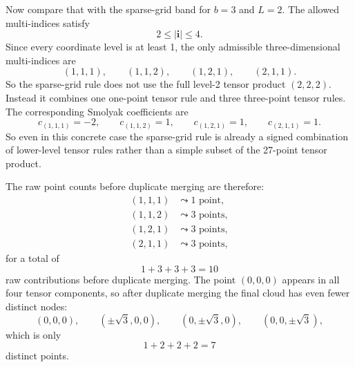 \documentclass[11pt]{article}
\numberwithin{equation}{section}
\begin{document}
Now compare that with the sparse-grid band for \(b=3\) and \(L=2\).  The
allowed multi-indices satisfy
\begin{equation}
  2\le |\mathbf i| \le 4.
  \label{eq:p37-3d-band}
\end{equation}
Since every coordinate level is at least 1, the only admissible three-dimensional
multi-indices are
\begin{equation}
  (1,1,1),
  \qquad
  (1,1,2),
  \qquad
  (1,2,1),
  \qquad
  (2,1,1).
  \label{eq:p37-3d-active-indices}
\end{equation}
So the sparse-grid rule does not use the full level-2 tensor product
\((2,2,2)\).  Instead it combines one one-point tensor rule and three
three-point tensor rules.  The corresponding Smolyak coefficients are
\begin{equation}
  c_{(1,1,1)}=-2,
  \qquad
  c_{(1,1,2)}=1,
  \qquad
  c_{(1,2,1)}=1,
  \qquad
  c_{(2,1,1)}=1.
  \label{eq:p37-3d-coeffs}
\end{equation}
So even in this concrete case the sparse-grid rule is already a signed
combination of lower-level tensor rules rather than a simple subset of the
27-point tensor product.

The raw point counts before duplicate merging are therefore:
\begin{align}
  (1,1,1) &\leadsto 1 \text{ point},
  \label{eq:p37-3d-count-111}\\
  (1,1,2) &\leadsto 3 \text{ points},
  \label{eq:p37-3d-count-112}\\
  (1,2,1) &\leadsto 3 \text{ points},
  \label{eq:p37-3d-count-121}\\
  (2,1,1) &\leadsto 3 \text{ points},
  \label{eq:p37-3d-count-211}
\end{align}
for a total of
\begin{equation}
  1+3+3+3=10
  \label{eq:p37-3d-raw-count}
\end{equation}
raw contributions before duplicate merging.  The point \((0,0,0)\) appears in
all four tensor components, so after duplicate merging the final cloud has even
fewer distinct nodes:
\begin{equation}
  (0,0,0),
  \qquad
  (\pm\sqrt3,0,0),
  \qquad
  (0,\pm\sqrt3,0),
  \qquad
  (0,0,\pm\sqrt3),
  \label{eq:p37-3d-final-nodes}
\end{equation}
which is only
\begin{equation}
  1+2+2+2 = 7
  \label{eq:p37-3d-final-count}
\end{equation}
distinct points.
\end{document}
